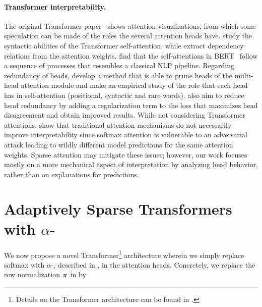\begin{sloppypar}
    \paragraph*{Transformer interpretability.}
    The original Transformer paper~\citep{vaswani2017attention} shows
    attention visualizations, from which some speculation can be made of
    the roles the several attention heads have.
    \citet{marecek-rosa-2018-extracting} study the syntactic abilities of
    the Transformer self-attention, while \citet{raganato2018analysis}
    extract dependency relations from the attention weights.
    \citet{bert-rediscovers} find that the self-attentions in
    BERT~\citep{devlin2018bert} follow a sequence of processes that
    resembles a classical NLP pipeline. Regarding redundancy of heads,
    \citet{specialized} develop a method that is able to prune heads of
    the multi-head attention module and make an empirical study of the
    role that each head has in self-attention (positional, syntactic and
    rare words). \citet{li2018multi} also aim to reduce head redundancy
    by adding a regularization term to the loss that maximizes head
    disagreement and obtain improved results. While not considering
    Transformer attentions, \citet{jain2019attention} show that
    traditional attention mechanisms do not necessarily improve
    interpretability since softmax attention is vulnerable to an
    adversarial attack leading to wildly different model predictions for
    the same attention weights. Sparse attention may mitigate these
    issues; however, our work focuses mostly on a more mechanical aspect
    of interpretation by analyzing head behavior, rather than on
    explanations for predictions.
\end{sloppypar}

\section{Adaptively Sparse Transformers with \texorpdfstring{{\boldmath $\alpha$}-\entmaxtext}{alpha-entmax}}
\label{sec:adaptive}

We now propose a novel Transformer\footnote{Details on the
    Transformer architecture can be found in
    .} architecture wherein we simply replace
softmax with $\alpha$-\entmaxtext{}, described in
, in the attention heads. Concretely, we
replace the row normalization $\bm{\pi}$ in 
by

